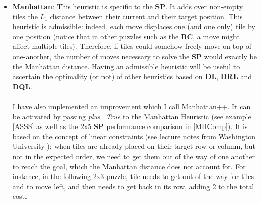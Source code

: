 \begin{itemize}
\item \textbf{Manhattan}: This heuristic is specific to the \textbf{SP}. It adds over non-empty tiles the $L_{1}$ distance between their current and their target position. This heuristic is admissible: indeed, each move displaces one (and one only) tile by one position (notice that in other puzzles such as the \textbf{RC}, a move might affect multiple tiles). Therefore, if tiles could somehow freely move on top of one-another, the number of moves necessary to solve the \textbf{SP} would exactly be the Manhattan distance. Having an admissible heuristic will be useful to ascertain the optimality (or not) of other heuristics based on \textbf{DL}, \textbf{DRL} and \textbf{DQL}.
\\
\\
I have also implemented an improvement which I call Manhattan++. It can be activated by passing \textit{plus=True} to the Manhattan Heuristic (see example \ref{ASSS} as well as the 2x5 \textbf{SP} performance comparison in \ref{MHComp}). It is based on the concept of linear constraints (see lecture notes from Washington University \cite{SlidingPuzzleLectureNotes}): when tiles are already placed on their target row or column, but not in the expected order, we need to get them out of the way of one another to reach the goal, which the Manhattan distance does not account for. For instance, in the following 2x3 puzzle, tile  \black needs to get out of the way for tiles  \black and  \black to move left, and then needs to get back in its row, adding 2 to the total cost.

\begin{center}
\begin{five}
\end{five}
\end{center}


\end{itemize}
